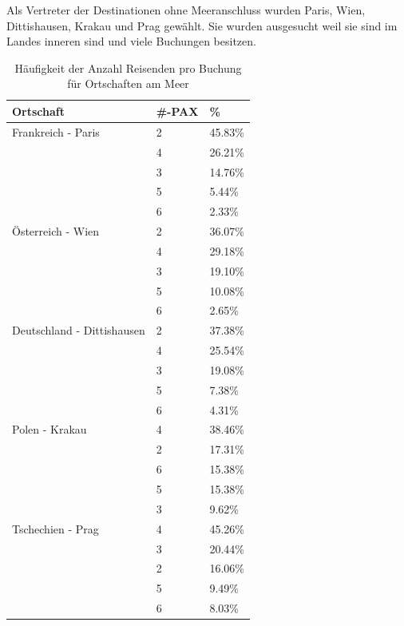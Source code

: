 Als Vertreter der Destinationen ohne Meeranschluss wurden Paris, Wien, Dittishausen, Krakau und Prag gewählt. Sie wurden ausgesucht weil sie sind im Landes inneren sind und viele Buchungen besitzen. 
\begin{table}[H] 
	\caption{Häufigkeit der Anzahl Reisenden pro Buchung für Ortschaften am Meer}
	\centering
	\label{sec:testingfazit:testing:hypothesen:3}
	\begin{tabular}{ | l | l | l | } 
		\hline 
		\rowcolor{tableheadcolor}
		\bfseries Ortschaft & \bfseries \#-PAX & \bfseries \% \\ \hline 
		Frankreich - Paris & 2 & \cellcolor{red!25}45.83\% \\ \cline{2-3} 
		 & 4 & \cellcolor{green!25}26.21\% \\ \cline{2-3}
		 & 3 & 14.76\% \\ \cline{2-3} 
		 & 5 & 5.44\% \\ \cline{2-3}
		 & 6 & 2.33\% \\ \hline 
		Österreich - Wien & 2 & \cellcolor{red!25}36.07\% \\ \cline{2-3} 
		 & 4 & \cellcolor{green!25}29.18\% \\ \cline{2-3}
		 & 3 & 19.10\% \\ \cline{2-3} 
		 & 5 & 10.08\% \\ \cline{2-3}
		 & 6 & 2.65\% \\ \hline 
		Deutschland - Dittishausen & 2 & \cellcolor{red!25}37.38\% \\ \cline{2-3}
		& 4 & \cellcolor{green!25}25.54\% \\ \cline{2-3} 
		& 3 & 19.08\% \\ \cline{2-3}
		& 5 & 7.38\% \\ \cline{2-3}
		& 6 & 4.31\% \\ \hline 
		Polen - Krakau & 4 & \cellcolor{green!25}38.46\% \\ \cline{2-3}
		& 2 & \cellcolor{red!25}17.31\% \\ \cline{2-3} 
		& 6 & 15.38\% \\ \cline{2-3}
		& 5 & 15.38\% \\ \cline{2-3}
		& 3 & 9.62\% \\ \hline 
		Tschechien - Prag & 4 & \cellcolor{green!25}45.26\% \\ \cline{2-3} 
		& 3 & 20.44\% \\ \cline{2-3}
		& 2 & \cellcolor{red!25}16.06\% \\ \cline{2-3} 
		& 5 & 9.49\% \\ \cline{2-3}
		& 6 & 8.03\% \\ \hline 
	\end{tabular}
\end{table}


